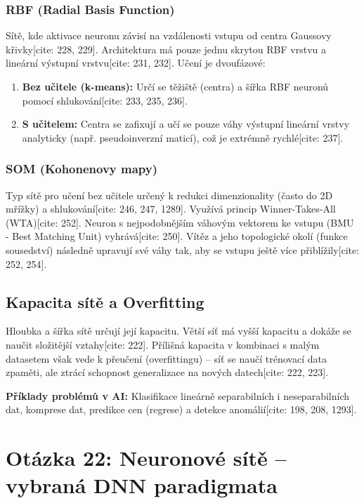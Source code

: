 \documentclass{article}
\begin{document}
\subsubsection{RBF (Radial Basis Function)}
Sítě, kde aktivace neuronu závisí na vzdálenosti vstupu od centra Gaussovy křivky[cite: 228, 229]. Architektura má pouze jednu skrytou RBF vrstvu a lineární výstupní vrstvu[cite: 231, 232]. Učení je dvoufázové:
\begin{enumerate}
    \item \textbf{Bez učitele (k-means):} Určí se těžiště (centra) a šířka RBF neuronů pomocí shlukování[cite: 233, 235, 236].
    \item \textbf{S učitelem:} Centra se zafixují a učí se pouze váhy výstupní lineární vrstvy analyticky (např. pseudoinverzní maticí), což je extrémně rychlé[cite: 237].
\end{enumerate}

\subsubsection{SOM (Kohonenovy mapy)}
Typ sítě pro učení bez učitele určený k redukci dimenzionality (často do 2D mřížky) a shlukování[cite: 246, 247, 1289]. Využívá princip Winner-Takes-All (WTA)[cite: 252]. Neuron s nejpodobnějším váhovým vektorem ke vstupu (BMU - Best Matching Unit) vyhrává[cite: 250]. Vítěz a jeho topologické okolí (funkce sousedství) následně upravují své váhy tak, aby se vstupu ještě více přiblížily[cite: 252, 254].

\subsection{Kapacita sítě a Overfitting}
Hloubka a šířka sítě určují její kapacitu. Větší síť má vyšší kapacitu a dokáže se naučit složitější vztahy[cite: 222]. Přílišná kapacita v kombinaci s malým datasetem však vede k přeučení (overfittingu) – síť se naučí trénovací data zpaměti, ale ztrácí schopnost generalizace na nových datech[cite: 222, 223].

\textbf{Příklady problémů v AI:} Klasifikace lineárně separabilních i neseparabilních dat, komprese dat, predikce cen (regrese) a detekce anomálií[cite: 198, 208, 1293].

\newpage

\section{Otázka 22: Neuronové sítě – vybraná DNN paradigmata}
\end{document}
